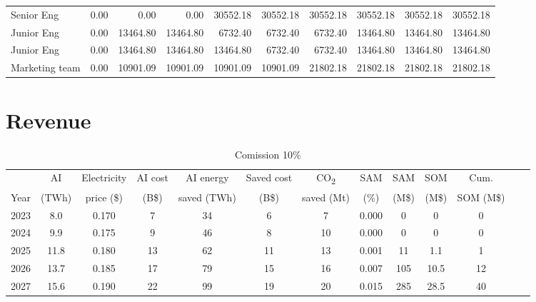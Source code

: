 \begin{table}[h]
\begin{tabular}{lrrrrrrrrr}
Senior Eng                       & 0.00     & 0.00     & 0.00     & 30552.18 & 30552.18 & 30552.18 & 30552.18 & 30552.18 & 30552.18\\
Junior Eng                       & 0.00     & 13464.80 & 13464.80 & 6732.40  & 6732.40  & 6732.40  & 13464.80 & 13464.80 & 13464.80\\
Junior Eng                       & 0.00     & 13464.80 & 13464.80 & 13464.80 & 6732.40  & 6732.40  & 13464.80 & 13464.80 & 13464.80\\
Marketing team             & 0.00     & 10901.09 & 10901.09 & 10901.09 & 10901.09 & 21802.18 & 21802.18 & 21802.18 & 21802.18\\
\bottomrule
\end{tabular}
\end{table}

\section{Revenue}

\begin{table}[h]
\footnotesize
\begin{tabular}{ccccccccccccc}
\toprule
 & AI & Electricity & AI cost & AI energy  & Saved cost & CO\textsubscript{2}  & SAM & SAM  & SOM  & Cum. \\
Year & (TWh) & price (\$) & (B\$) & saved (TWh) &  (B\$) & saved (Mt) & (\%) &   (M\$) & (M\$) & SOM (M\$) \\
\midrule
2023 & 8.0    & 0.170   & 7   & 34  & 6   & 7   & 0.000     & 0     & 0    & 0 \\
2024 & 9.9  & 0.175  & 9   & 46  & 8   & 10  & 0.000     & 0      & 0    & 0 \\
2025 & 11.8 & 0.180   & 13  & 62  & 11  & 13  & 0.001 & 11     & 1.1  & 1 \\
2026 & 13.7 & 0.185  & 17  & 79  & 15  & 16  & 0.007 & 105   & 10.5 & 12 \\
2027 & 15.6 & 0.190  & 22  & 99  & 19  & 20  & 0.015 & 285   & 28.5 & 40 \\
\bottomrule
\end{tabular}
\caption{Comission 10\%}
\end{table}
